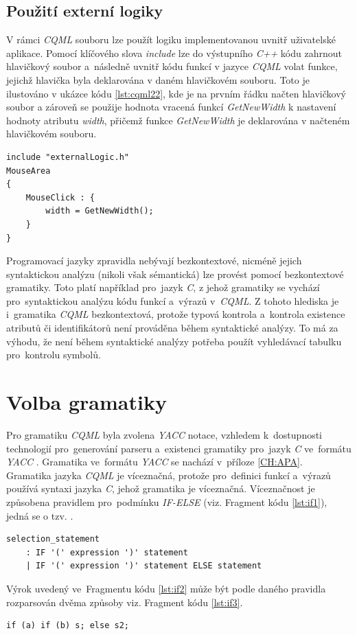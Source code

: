 \documentclass[11pt,twoside,a4paper]{book}
\begin{document}
\subsection{Použití externí logiky} %
V rámci \textit{CQML} souboru lze použít logiku implementovanou uvnitř uživatelské aplikace. Pomocí klíčového slova \textit{include} lze do výstupního \textit{C++} kódu zahrnout hlavičkový soubor a~následně uvnitř kódu funkcí v jazyce \textit{CQML} volat funkce, jejichž hlavička byla deklarována v daném hlavičkovém souboru. Toto je ilustováno v ukázce kódu \ref{lst:cqml22}, kde je na prvním řádku načten hlavičkový soubor  a zároveň se použije hodnota vracená funkcí \textit{GetNewWidth} k nastavení hodnoty atributu \textit{width}, přičemž funkce \textit{GetNewWidth} je deklarována v načteném hlavičkovém souboru.
\begin{lstlisting}[frame=single,caption=Ukázka použití funkce deklarované v hlavičkovém souborue.,label=lst:cqml22]
include "externalLogic.h"
MouseArea
{
	MouseClick : {
		width = GetNewWidth();
	}
}
\end{lstlisting}

Programovací jazyky zpravidla nebývají bezkontextové, nicméně jejich syntaktickou analýzu (nikoli však sémantická) lze provést pomocí bezkontextové gramatiky. Toto platí například pro~jazyk \textit{C}, z jehož gramatiky se vychází pro~syntaktickou analýzu kódu funkcí a~výrazů v~\textit{CQML}. Z tohoto hlediska je i~gramatika \textit{CQML} bezkontextová, protože typová kontrola a~kontrola existence atributů či identifikátorů není prováděna během syntaktické analýzy. To má za výhodu, že není během syntaktické analýzy potřeba použít vyhledávací tabulku pro~kontrolu symbolů.\\
\section{Volba gramatiky}
Pro gramatiku \textit{CQML} byla zvolena \textit{YACC} notace, vzhledem k~dostupnosti technologií pro~generování parseru a~existenci gramatiky pro~jazyk \textit{C} \cite{bib:CGrammar} ve~formátu \textit{YACC} \cite{bib:YACC}. Gramatika ve~formátu \textit{YACC} se nachází v~příloze \ref{CH:APA}.\\
Gramatika jazyka \textit{CQML} je víceznačná, protože pro~definici funkcí a~výrazů používá syntaxi jazyka \textit{C}, jehož gramatika je víceznačná. Víceznačnost je způsobena pravidlem pro~podmínku \textit{IF-ELSE} (viz. Fragment kódu \ref{lst:if1}), jedná se o tzv. .\\
\begin{lstlisting}[frame=single,caption=Víceznačné \textit{IF-ELSE} pravidlo gramatiky.,label=lst:if1]
selection_statement
	: IF '(' expression ')' statement
	| IF '(' expression ')' statement ELSE statement 
\end{lstlisting}
Výrok uvedený ve~Fragmentu kódu \ref{lst:if2} může být podle daného pravidla rozparsován dvěma způsoby viz. Fragment kódu \ref{lst:if3}.
\begin{lstlisting}[frame=single,caption=Příklad víceznačného výroku \textit{IF}-\textit{ELSE},label=lst:if2]
if (a) if (b) s; else s2;
\end{lstlisting}
\end{document}
